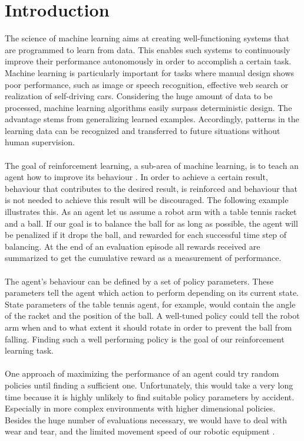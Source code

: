 \chapter{Introduction}
\label{chap:0}

The science of machine learning aims at creating well-functioning systems that are programmed to learn from data. This enables such systems to continuously improve their performance autonomously in order to accomplish a certain task. Machine learning is particularly important for tasks where manual design shows poor performance, such as image or speech recognition, effective web search or realization of self-driving cars. Considering the huge amount of data to be processed, machine learning algorithms easily surpass deterministic design. The advantage stems from generalizing learned examples. Accordingly, patterns in the learning data can be recognized and transferred to future situations without human supervision.\\
\\
The goal of reinforcement learning, a sub-area of machine learning, is to teach an agent how to improve its behaviour \cite{sutton1998reinforcement}. In order to achieve a certain result, behaviour that contributes to the desired result, is reinforced and behaviour that is not needed to achieve this result will be discouraged. The following example illustrates this. As an agent let us assume a robot arm with a table tennis racket and a ball. If our goal is to balance the ball for as long as possible, the agent will be penalized if it drops the ball, and rewarded for each successful time step of balancing. At the end of an evaluation episode all
rewards received are summarized to get the cumulative reward as a measurement of performance.\\
\\
The agent's behaviour can be defined by a set of policy parameters. These parameters tell the agent which action to perform depending on its current state. State parameters of the table tennis agent, for example, would contain the angle of the racket and the position of the ball. A well-tuned policy could tell the robot arm when and to what extent it should rotate in order to prevent the ball from falling. Finding such a well performing policy is the goal of our reinforcement learning task.\\
\\
One approach of maximizing the performance of an agent could try random policies until finding a sufficient one. Unfortunately, this would take a very long time because it is highly unlikely to find suitable policy parameters by accident. Especially in more complex environments with higher dimensional policies. Besides the huge number of evaluations necessary, we would have to deal with wear and tear, and the limited movement speed of our robotic equipment \cite{shahriari2016taking}.\\
